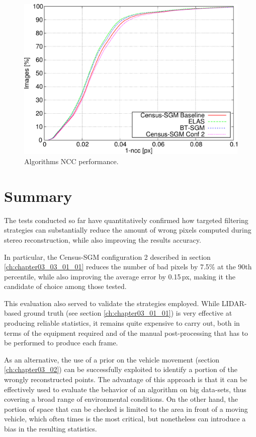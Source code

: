 \begin{figure}[h]
  \centering
  \includegraphics[width=\textwidth, trim=0 0 0 0,clip]{algo_ncc}
  \caption{ Algorithms NCC performance.}
  \label{fig:cp03_algorithms_NCC}
\end{figure}%

\section{Summary}\label{ch:chapter03_05}

The tests conducted so far have quantitatively confirmed how targeted filtering strategies can substantially reduce the amount of wrong pixels computed during stereo reconstruction, while also improving the results accuracy.

In particular, the Census-SGM configuration 2 described in section \ref{ch:chapter03_03_01_01} reduces the number of bad pixels by 7.5\% at the 90th percentile, while also improving the average error by 0.15\,px, making it the candidate of choice among those tested.

This evaluation also served to validate the strategies employed. While LIDAR-based ground truth (see section \ref{ch:chapter03_01_01}) is very effective at producing reliable statistics, it remains quite expensive to carry out, both in terms of the equipment required and of the manual post-processing that has to be performed to produce each frame.

As an alternative, the use of a prior on the vehicle movement (section \ref{ch:chapter03_02}) can be successfully exploited to identify a portion of the wrongly reconstructed points. The advantage of this approach is that it can be effectively used to evaluate the behavior of an algorithm on big data-sets, thus covering a broad range of environmental conditions. On the other hand, the portion of space that can be checked is limited to the area in front of a moving vehicle, which often times is the most critical, but nonetheless can introduce a bias in the resulting statistics.

